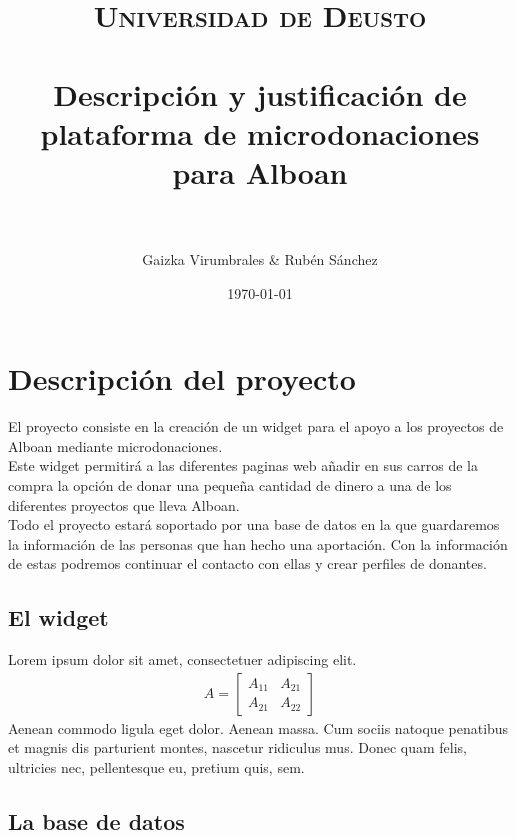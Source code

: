 \documentclass[paper=a4, fontsize=11pt]{scrartcl} %
\title{	
\normalfont \normalsize 
\textsc{Universidad de Deusto} \\ [25pt] %
\horrule{0.5pt} \\[0.4cm] %
\huge Descripción y justificación de plataforma de microdonaciones para Alboan\\ %
\horrule{2pt} \\[0.5cm] %
}
\author{Gaizka Virumbrales \& Rubén Sánchez} %
\date{\normalsize\today} %
\numberwithin{equation}{section} %
\numberwithin{figure}{section} %
\numberwithin{table}{section} %
\begin{document}
\maketitle %


\section{Descripción del proyecto}

El proyecto consiste en la creación de un widget para el apoyo a los proyectos de Alboan mediante microdonaciones.\\
Este widget permitirá a las diferentes paginas web añadir en sus carros de la compra la opción de donar una pequeña cantidad de dinero a una de los diferentes proyectos que lleva Alboan.\\
Todo el proyecto estará soportado por una base de datos en la que guardaremos la información de las personas que han hecho una aportación. Con la información de estas podremos continuar el contacto con ellas y crear perfiles de donantes.


\subsection{El widget}

Lorem ipsum dolor sit amet, consectetuer adipiscing elit. 
\begin{align}
A = 
\begin{bmatrix}
A_{11} & A_{21} \\
A_{21} & A_{22}
\end{bmatrix}
\end{align}
Aenean commodo ligula eget dolor. Aenean massa. Cum sociis natoque penatibus et magnis dis parturient montes, nascetur ridiculus mus. Donec quam felis, ultricies nec, pellentesque eu, pretium quis, sem.


\subsection{La base de datos}
\end{document}
